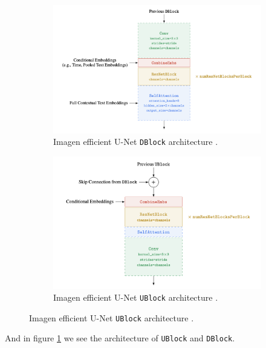 \begin{figure}
    \centering
    \caption{Efficient \texttt{UBlock} and \texttt{DBlock} architectures proposed in Imagen paper \cite{imagen}.}
    \begin{subfigure}[b]{0.5\textwidth}   
        \centering 
        \includegraphics[width=\textwidth]{images/appendix/imagen/dblock.png}
        \caption[]%
        {{\small Imagen efficient U-Net \texttt{DBlock} architecture \cite{imagen}.}}
    \end{subfigure}
    \hfill
    \begin{subfigure}[b]{0.475\textwidth}
        \centering
        \includegraphics[width=\textwidth]{images/appendix/imagen/ublock.png}
        \caption[]%
        {{\small Imagen efficient U-Net \texttt{UBlock} architecture \cite{imagen}.}}
    \end{subfigure}
    \label{fig:imagen_dblock_ublock}
\end{figure}

And in figure \ref{fig:imagen_dblock_ublock} we see the architecture of \texttt{UBlock} and \texttt{DBlock}.















